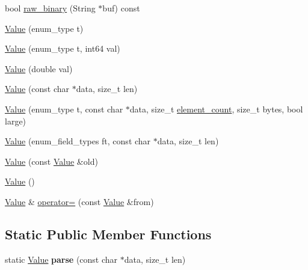 \begin{DoxyCompactItemize}
bool \mbox{\hyperlink{classjson__binary_1_1Value_a6ea6a826dbc7c0e078e73271b8afa2a1}{raw\+\_\+binary}} (String $\ast$buf) const
\item 
\mbox{\hyperlink{classjson__binary_1_1Value_ac0bba537527afc9a09bee2afa60aa9d1}{Value}} (enum\+\_\+type t)
\item 
\mbox{\hyperlink{classjson__binary_1_1Value_ad595308589a4d88800fc515b076e2b8f}{Value}} (enum\+\_\+type t, int64 val)
\item 
\mbox{\hyperlink{classjson__binary_1_1Value_a73ddf21993bc1e863b1848b362681dad}{Value}} (double val)
\item 
\mbox{\hyperlink{classjson__binary_1_1Value_adad7db231ae7f2d1c262e1631fa0e7f2}{Value}} (const char $\ast$data, size\+\_\+t len)
\item 
\mbox{\hyperlink{classjson__binary_1_1Value_a6d8722c6f014798bbda4ff8243ee1d64}{Value}} (enum\+\_\+type t, const char $\ast$data, size\+\_\+t \mbox{\hyperlink{classjson__binary_1_1Value_aa45a919f10c1421d765ecfbc8491aa95}{element\+\_\+count}}, size\+\_\+t bytes, bool large)
\item 
\mbox{\hyperlink{classjson__binary_1_1Value_a33358973f44b358f8b169259852e6280}{Value}} (enum\+\_\+field\+\_\+types ft, const char $\ast$data, size\+\_\+t len)
\item 
\mbox{\hyperlink{classjson__binary_1_1Value_a567bea13aa2f1e23677fcc0557fec53d}{Value}} (const \mbox{\hyperlink{classjson__binary_1_1Value}{Value}} \&old)
\item 
\mbox{\hyperlink{classjson__binary_1_1Value_aaa07e73820e6dfe8727fa473de0dfe37}{Value}} ()
\item 
\mbox{\hyperlink{classjson__binary_1_1Value}{Value}} \& \mbox{\hyperlink{classjson__binary_1_1Value_a71e1b7a00567cef587fa9ea3569eedeb}{operator=}} (const \mbox{\hyperlink{classjson__binary_1_1Value}{Value}} \&from)
\end{DoxyCompactItemize}
\subsection*{Static Public Member Functions}
\begin{DoxyCompactItemize}
\item 
\mbox{\label{classjson__binary_1_1Value_a6f6cd275f914b430bfdca0c345c09ed2}} 
static \mbox{\hyperlink{classjson__binary_1_1Value}{Value}} {\bfseries parse} (const char $\ast$data, size\+\_\+t len)
\end{DoxyCompactItemize}


